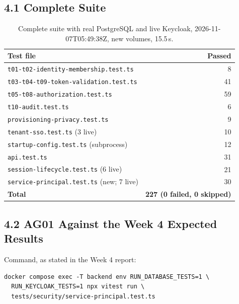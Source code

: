\documentclass{article}
\begin{document}
\subsection*{4.1 Complete Suite}
\begin{table}[H]
\centering
\begin{tabular}{lr}
\toprule
\textbf{Test file} & \textbf{Passed} \\
\midrule
\texttt{t01-t02-identity-membership.test.ts} & 8 \\
\texttt{t03-t04-t09-token-validation.test.ts} & 41 \\
\texttt{t05-t08-authorization.test.ts} & 59 \\
\texttt{t10-audit.test.ts} & 6 \\
\texttt{provisioning-privacy.test.ts} & 9 \\
\texttt{tenant-sso.test.ts} (3 live) & 10 \\
\texttt{startup-config.test.ts} (subprocess) & 12 \\
\texttt{api.test.ts} & 31 \\
\texttt{session-lifecycle.test.ts} (6 live) & 21 \\
\texttt{service-principal.test.ts} (new; 7 live) & 30 \\
\midrule
\textbf{Total} & \textbf{227 (0 failed, 0 skipped)} \\
\bottomrule
\end{tabular}
\caption{Complete suite with real PostgreSQL and live Keycloak, 2026-11-07T05:49:38Z, new volumes, 15.5\,s.}
\end{table}

\subsection*{4.2 AG01 Against the Week 4 Expected Results}
Command, as stated in the Week 4 report:
\begin{verbatim}
docker compose exec -T backend env RUN_DATABASE_TESTS=1 \
  RUN_KEYCLOAK_TESTS=1 npx vitest run \
  tests/security/service-principal.test.ts
\end{verbatim}
\end{document}
